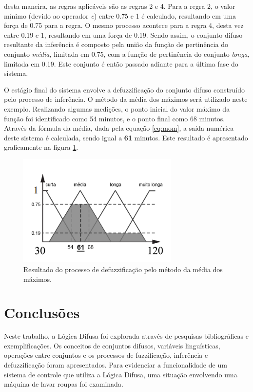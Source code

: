 \documentclass[12pt]{article}
\begin{document}
\noindent desta maneira, as regras aplicáveis são as regras 2 e 4. Para a regra 2, o valor mínimo (devido ao operador \textit{e}) entre 0.75 e 1 é calculado, resultando em uma força de 0.75 para a regra. O mesmo processo acontece para a regra 4, desta vez entre 0.19 e 1, resultando em uma força de 0.19. Sendo assim, o conjunto difuso  resultante da inferência é composto pela união da função de pertinência do conjunto \textit{média}, limitada em 0.75, com a função de pertinência do conjunto \textit{longa}, limitada em 0.19. Este conjunto é então passado adiante para a última fase do sistema.

O estágio final do sistema envolve a defuzzificação do conjunto difuso construído pelo processo de inferência. O método da média dos máximos será utilizado neste exemplo. Realizando algumas medições, o ponto inicial do valor máximo da função foi identificado como 54 minutos, e o ponto final como 68 minutos. Através da fórmula da média, dada pela equação \ref{eq:mom}, a saída numérica deste sistema é calculada, sendo igual a \textbf{61} minutos. Este resultado é apresentado graficamente na figura \ref{fig:defuzzification}.

\begin{figure}
    \centering
    \includegraphics[width=8cm]{defuzzification.png}
    \caption{Resultado do processo de defuzzificação pelo método da média dos máximos.}
    \label{fig:defuzzification}
\end{figure}

\section{Conclusões}

Neste trabalho, a Lógica Difusa foi explorada através de pesquisas bibliográficas e exemplificações. Os conceitos de conjuntos difusos, variáveis linguísticas, operações entre conjuntos e os processos de fuzzificação, inferência e defuzzificação foram apresentados. Para evidenciar a funcionalidade de um sistema de controle que utiliza a Lógica Difusa, uma situação envolvendo uma máquina de lavar roupas foi examinada.
\end{document}
